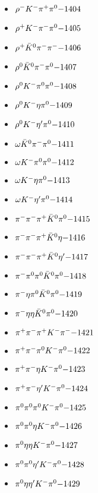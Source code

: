 \begin{multicols}{3}
\begin{itemize}
 \item $ \rho^{-} K^{-} \pi^{+} \pi^{0} \hfill{-1404}$
 \item $ \rho^{+} K^{-} \pi^{-} \pi^{0} \hfill{-1405}$
 \item $ \rho^{+} \bar{K}^{0} \pi^{-} \pi^{-} \hfill{-1406}$
 \item $ \rho^{0} \bar{K}^{0} \pi^{-} \pi^{0} \hfill{-1407}$
 \item $ \rho^{0} K^{-} \pi^{0} \pi^{0} \hfill{-1408}$
 \item $ \rho^{0} K^{-} \eta \pi^{0} \hfill{-1409}$
 \item $ \rho^{0} K^{-} {\eta^{\prime}} \pi^{0} \hfill{-1410}$
 \item $ \omega \bar{K}^{0} \pi^{-} \pi^{0} \hfill{-1411}$
 \item $ \omega K^{-} \pi^{0} \pi^{0} \hfill{-1412}$
 \item $ \omega K^{-} \eta \pi^{0} \hfill{-1413}$
 \item $ \omega K^{-} {\eta^{\prime}} \pi^{0} \hfill{-1414}$
 \item $ \pi^{-} \pi^{-} \pi^{+} \bar{K}^{0} \pi^{0} \hfill{-1415}$
 \item $ \pi^{-} \pi^{-} \pi^{+} \bar{K}^{0} \eta \hfill{-1416}$
 \item $ \pi^{-} \pi^{-} \pi^{+} \bar{K}^{0} {\eta^{\prime}} \hfill{-1417}$
 \item $ \pi^{-} \pi^{0} \pi^{0} \bar{K}^{0} \pi^{0} \hfill{-1418}$
 \item $ \pi^{-} \eta \pi^{0} \bar{K}^{0} \pi^{0} \hfill{-1419}$
 \item $ \pi^{-} \eta \eta \bar{K}^{0} \pi^{0} \hfill{-1420}$
 \item $ \pi^{+} \pi^{-} \pi^{+} K^{-} \pi^{-} \hfill{-1421}$
 \item $ \pi^{+} \pi^{-} \pi^{0} K^{-} \pi^{0} \hfill{-1422}$
 \item $ \pi^{+} \pi^{-} \eta K^{-} \pi^{0} \hfill{-1423}$
 \item $ \pi^{+} \pi^{-} {\eta^{\prime}} K^{-} \pi^{0} \hfill{-1424}$
 \item $ \pi^{0} \pi^{0} \pi^{0} K^{-} \pi^{0} \hfill{-1425}$
 \item $ \pi^{0} \pi^{0} \eta K^{-} \pi^{0} \hfill{-1426}$
 \item $ \pi^{0} \eta \eta K^{-} \pi^{0} \hfill{-1427}$
 \item $ \pi^{0} \pi^{0} {\eta^{\prime}} K^{-} \pi^{0} \hfill{-1428}$
 \item $ \pi^{0} \eta {\eta^{\prime}} K^{-} \pi^{0} \hfill{-1429}$

\end{itemize}
\end{multicols}
